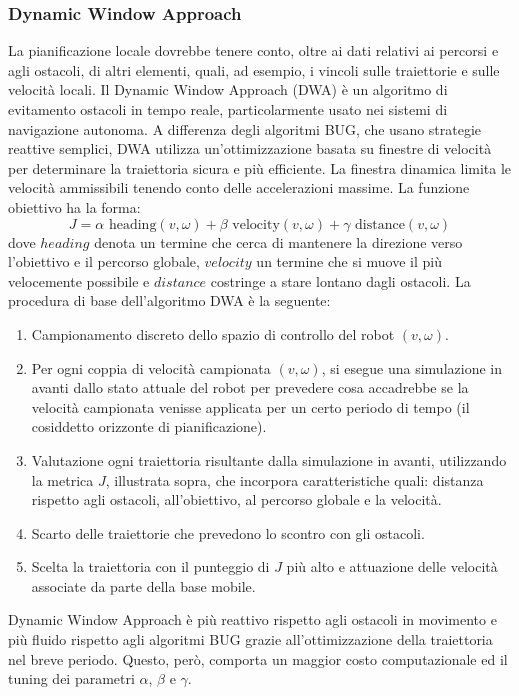 \subsubsection{Dynamic Window Approach}
La pianificazione locale dovrebbe tenere conto, oltre ai dati relativi ai percorsi e agli ostacoli, di altri elementi, quali, ad esempio, i vincoli sulle traiettorie e sulle velocità locali. Il Dynamic Window Approach (DWA) è un algoritmo di evitamento ostacoli in tempo reale, particolarmente usato nei sistemi di navigazione autonoma. A differenza degli algoritmi BUG, che usano strategie reattive semplici, DWA utilizza un'ottimizzazione basata su finestre di velocità per determinare la traiettoria sicura e più efficiente. La finestra dinamica limita le velocità ammissibili tenendo conto delle accelerazioni massime. La funzione obiettivo ha la forma:
\[J=\alpha \text{ heading}(v,\omega)+ \beta \text{ velocity}(v,\omega)+ \gamma \text{ distance}(v,\omega)\]
dove $heading$ denota un termine che cerca di mantenere la direzione verso l'obiettivo e il percorso globale, $velocity$ un termine che si muove il più velocemente possibile e $distance$ costringe a stare lontano dagli ostacoli. La procedura di base dell'algoritmo DWA è la seguente:
\begin{enumerate}
    \item Campionamento discreto dello spazio di controllo del robot $(v,\omega)$.
    \item Per ogni coppia di velocità campionata $(v,\omega)$, si esegue una simulazione in avanti dallo stato attuale del robot per prevedere cosa accadrebbe se la velocità campionata venisse applicata per un certo periodo di tempo (il cosiddetto orizzonte di pianificazione).
    \item Valutazione ogni traiettoria risultante dalla simulazione in avanti, utilizzando la metrica $J$, illustrata sopra, che incorpora caratteristiche quali: distanza rispetto agli ostacoli, all'obiettivo, al percorso globale e la velocità.
    \item Scarto delle traiettorie che prevedono lo scontro con gli ostacoli.
    \item Scelta la traiettoria con il punteggio di $J$ più alto e attuazione delle velocità associate da parte della base mobile.
\end{enumerate}
Dynamic Window Approach è più reattivo rispetto agli ostacoli in movimento e più fluido rispetto agli algoritmi BUG grazie all'ottimizzazione della traiettoria nel breve periodo. Questo, però, comporta un maggior costo computazionale ed il tuning dei parametri $\alpha$, $\beta$ e $\gamma$.

